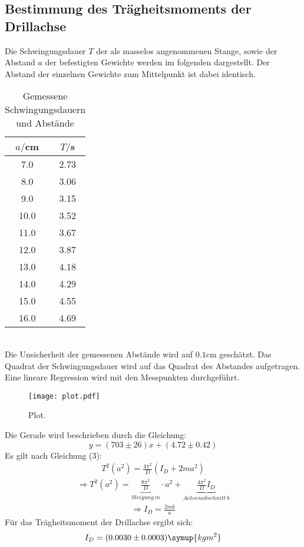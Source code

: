 \subsection{Bestimmung des Trägheitsmoments der Drillachse}
Die Schwingungsdauer $T$ der als masselos angenommenen Stange, sowie der Abstand $a$
der befestigten Gewichte werden im folgenden dargestellt. Der Abstand der einzelnen
Gewichte zum Mittelpunkt ist dabei identisch.
\begin{table}
  \centering
  \caption{Gemessene Schwingungsdauern und Abstände}
  \label{tab:Gemessene Schwingungsdauern und Abstände}
  \begin{tabular}{c c}
    \toprule
    $a/$cm & $T/$s \\
    \midrule
     7.0 & 2.73 \\
     8.0 & 3.06 \\
     9.0 & 3.15 \\
    10.0 & 3.52 \\
    11.0 & 3.67 \\
    12.0 & 3.87 \\
    13.0 & 4.18 \\
    14.0 & 4.29 \\
    15.0 & 4.55 \\
    16.0 & 4.69 \\
    \bottomrule
  \end{tabular}
\end{table} \\

Die Unsicherheit der gemessenen Abstände wird auf $0.1$cm geschätzt.
Das Quadrat der Schwingungsdauer wird auf das Quadrat des Abstandes
aufgetragen. Eine lineare Regression wird mit den Messpunkten durchgeführt.

\begin{figure}[H]
  \centering
  \texttt{[image: plot.pdf]}
  \caption{Plot.}
  \label{fig:plot}
\end{figure}

Die Gerade wird beschrieben durch die Gleichung:
\begin{equation}
  y = (703 \pm 26)x + (4.72 \pm 0.42)
\end{equation}
Es gilt nach Gleichung (3):
\begin{align}
  T^2(a^2) = \frac{4\pi^2}{D}(I_D + 2ma^2)
\end{align}
\begin{align}
  \Rightarrow T^2(a^2) = \underbrace{\frac{8\pi^2}{D}}_{Steigung \: m} \cdot a^2 + \underbrace{\frac{4\pi^2}{D}I_D}_{Achsenabschnitt \: b}
\end{align}
\begin{align}
  \Rightarrow I_D = \frac{2mb}{a}
\end{align}
Für das Trägheitsmoment der Drillachse ergibt sich:
\begin{equation}
  I_D = (0.0030 \pm 0.0003) \symup{kgm^2}
\end{equation}


